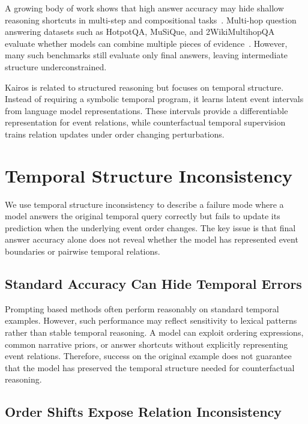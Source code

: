 \documentclass[11pt]{article}
\newcommand{\method}{Kairos}
\begin{document}
A growing body of work shows that high answer accuracy may hide shallow reasoning shortcuts in multi-step and compositional tasks~\citep{min2019compositional,sinha2019clutrr,lake2018generalization,keysers2020measuring,press2023measuring}. Multi-hop question answering datasets such as HotpotQA, MuSiQue, and 2WikiMultihopQA evaluate whether models can combine multiple pieces of evidence~\citep{yang2018hotpotqa,trivedi2022musique,ho2020constructing}. However, many such benchmarks still evaluate only final answers, leaving intermediate structure underconstrained.

\method{} is related to structured reasoning but focuses on temporal structure. Instead of requiring a symbolic temporal program, it learns latent event intervals from language model representations. These intervals provide a differentiable representation for event relations, while counterfactual temporal supervision trains relation updates under order changing perturbations.

\section{Temporal Structure Inconsistency}

We use temporal structure inconsistency to describe a failure mode where a model answers the original temporal query correctly but fails to update its prediction when the underlying event order changes. The key issue is that final answer accuracy alone does not reveal whether the model has represented event boundaries or pairwise temporal relations.

\subsection{Standard Accuracy Can Hide Temporal Errors}

Prompting based methods often perform reasonably on standard temporal examples. However, such performance may reflect sensitivity to lexical patterns rather than stable temporal reasoning. A model can exploit ordering expressions, common narrative priors, or answer shortcuts without explicitly representing event relations. Therefore, success on the original example does not guarantee that the model has preserved the temporal structure needed for counterfactual reasoning.

\subsection{Order Shifts Expose Relation Inconsistency}
\end{document}

